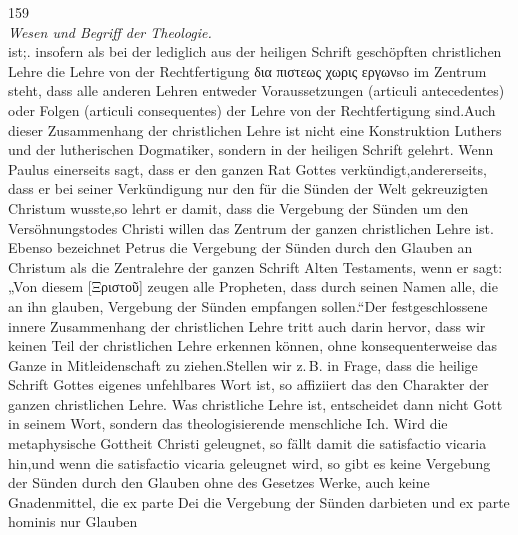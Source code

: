 159\\ \textit{Wesen und Begriff der Theologie.}\\ \noindent ist;. insofern als bei der lediglich aus der heiligen Schrift geschöpften christlichen Lehre die Lehre von der Rechtfertigung \textgreek{δια πιστεως χωρις εργων}\footnotemark[547] so im Zentrum steht, dass alle anderen Lehren entweder Voraussetzungen (articuli antecedentes) oder Folgen (articuli consequentes) der Lehre von der Rechtfertigung sind.\footnotemark[548] Auch dieser Zusammenhang der christlichen Lehre ist nicht eine Konstruktion Luthers und der lutherischen Dogmatiker, sondern in der heiligen Schrift gelehrt. Wenn Paulus einerseits sagt, dass er den ganzen Rat Gottes verkündigt,\footnotemark[549] andererseits, dass er bei seiner Verkündigung nur den für die Sünden der Welt gekreuzigten Christum wusste,\footnotemark[550] so lehrt er damit, dass die Vergebung der Sünden um den Versöhnungstodes Christi willen das Zentrum der ganzen christlichen Lehre ist. Ebenso bezeichnet Petrus die Vergebung der Sünden durch den Glauben an Christum als die Zentralehre der ganzen Schrift Alten Testaments, wenn er sagt: „Von diesem [\textgreek{Ξριστοῦ}] zeugen alle Propheten, dass durch seinen Namen alle, die an ihn glauben, Vergebung der Sünden empfangen sollen.“\footnotemark[551] Der festgeschlossene innere Zusammenhang der christlichen Lehre tritt auch darin hervor, dass wir keinen Teil der christlichen Lehre erkennen können, ohne konsequenterweise das Ganze in Mitleidenschaft zu ziehen.\footnotemark[552] Stellen wir z.\,B. in Frage, dass die heilige Schrift Gottes eigenes unfehlbares Wort ist, so affiziiert das den Charakter der ganzen christlichen Lehre. Was christliche Lehre ist, entscheidet dann nicht Gott in seinem Wort, sondern das theologisierende menschliche Ich. Wird die metaphysische Gottheit Christi geleugnet, so fällt damit die satisfactio vicaria hin,\footnotemark[553] und wenn die satisfactio vicaria geleugnet wird, so gibt es keine Vergebung der Sünden durch den Glauben ohne des Gesetzes Werke, auch keine Gnadenmittel, die ex parte Dei die Vergebung der Sünden darbieten und ex parte hominis nur Glauben\\ \ \ \ \ \ \ \ 
